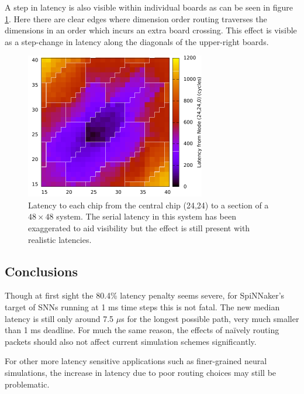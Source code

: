 				A step in latency is also visible within individual boards as can be
				seen in figure \ref{fig:packet-latency-closeup-exaggerated}. Here there
				are clear edges where dimension order routing traverses the dimensions
				in an order which incurs an extra board crossing. This effect is visible
				as a step-change in latency along the diagonals of the upper-right
				boards.
		
				\begin{figure}
					\center
					\includegraphics[width=0.7\textwidth]{figures/packet-latency-closeup-exaggerated.pdf}
					
					\caption[Latency to a subset of chips with exaggerated board-to-board
					latency.]{Latency to each chip from the central chip (24,24) to a
					section of a $48\times{}48$ system. The serial latency in this system
					has been exaggerated to aid visibility but the effect is still present
					with realistic latencies.}
					
					\label{fig:packet-latency-closeup-exaggerated}
				\end{figure}
		
		\subsection{Conclusions}
			
			Though at first sight the 80.4\% latency penalty seems severe, for
			SpiNNaker's target of SNNs running at 1 ms time steps this is not fatal.
			The new median latency is still only around 7.5 $\mu$s for the longest
			possible path, very much smaller than 1 ms deadline.  For much the same
			reason, the effects of na\"ively routing packets should also not affect
			current simulation schemes significantly.
			
			For other more latency sensitive applications such as finer-grained neural
			simulations, the increase in latency due to poor routing choices may still
			be problematic.
			
